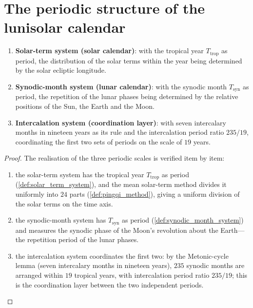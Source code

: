 \section{The periodic structure of the lunisolar calendar}
\label{sec:lunisolar_structure}

\begin{theorem}\label{thm:lunisolar_grammar_unity}
\begin{enumerate}[label=(\roman*)]
    \item \textbf{Solar-term system (solar calendar)}: with the tropical year \(T_{\text{trop}}\) as period, the distribution of the solar terms within the year being determined by the solar ecliptic longitude.
    \item \textbf{Synodic-month system (lunar calendar)}: with the synodic month \(T_{\text{syn}}\) as period, the repetition of the lunar phases being determined by the relative positions of the Sun, the Earth and the Moon.
    \item \textbf{Intercalation system (coordination layer)}: with seven intercalary months in nineteen years as its rule and the intercalation period ratio \(235/19\), coordinating the first two sets of periods on the scale of \(19\) years.
\end{enumerate}
\end{theorem}

\begin{proof}
The realisation of the three periodic scales is verified item by item:
\begin{enumerate}[label=(\roman*)]
\item the solar-term system has the tropical year \(T_{\text{trop}}\) as period (\cref{def:solar_term_system}), and the mean solar-term method divides it uniformly into \(24\) parts (\cref{def:pingqi_method}), giving a uniform division of the solar terms on the time axis.
\item the synodic-month system has \(T_{\text{syn}}\) as period (\cref{def:synodic_month_system}) and measures the synodic phase of the Moon's revolution about the Earth---the repetition period of the lunar phases.
\item the intercalation system coordinates the first two: by the Metonic-cycle lemma (seven intercalary months in nineteen years), \(235\) synodic months are arranged within \(19\) tropical years, with intercalation period ratio \(235/19\); this is the coordination layer between the two independent periods.
\end{enumerate}
\end{proof}

